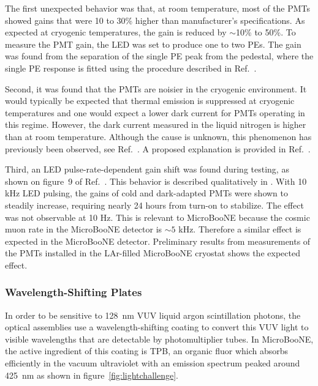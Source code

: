 The first unexpected behavior was that, at room temperature, 
most of the PMTs showed gains that were 10 to 30\% higher than manufacturer's specifications.
As expected at cryogenic temperatures, the gain is reduced by $\sim$10\% to 50\%.
To measure the PMT gain, the LED was set to produce one to two PEs.  
The gain was found from the separation of the single PE peak from the pedestal, where the single PE response is fitted using the procedure described in Ref.~\cite{Bellamy:1994bv}.   

Second, it was found that the PMTs are noisier in the cryogenic environment. 
It would typically be expected that thermal emission is suppressed at cryogenic temperatures and one would expect a lower dark current 
for PMTs operating in this regime.  
However, the dark current measured in the liquid nitrogen is higher than at room temperature. 
Although the cause is unknown, this phenomenon has previously been observed, see Ref.~\cite{Meyer:2008qb}. A proposed explanation is provided in Ref.~\cite{MeyerDark}.

Third, an LED pulse-rate-dependent gain shift was found during testing, as shown on figure~9 of Ref.~\cite{Briese:2013wua}.  This behavior is described qualitatively in \cite{HamamatsuBook}.  With 10 kHz LED pulsing, the gains of cold and dark-adapted PMTs were shown to steadily increase, requiring nearly 24 hours from turn-on to stabilize. The effect was not observable at 10 Hz.   This is relevant to MicroBooNE because the
cosmic muon rate in the MicroBooNE detector is $\sim 5$ kHz.  Therefore a similar effect is expected in the MicroBooNE detector.  Preliminary results from measurements of the PMTs installed in the LAr-filled MicroBooNE cryostat shows the expected effect. 



\subsubsection{Wavelength-Shifting Plates}
\label{sec:wavelengthshift}


In order to be sensitive to 128~nm VUV liquid argon scintillation photons, the optical assemblies use a wavelength-shifting coating to convert this VUV light to visible wavelengths that are detectable by photomultiplier tubes.  In MicroBooNE, the active ingredient of this coating is TPB, an organic fluor which absorbs efficiently in the vacuum ultraviolet with an emission spectrum peaked around 425~nm \cite{Burton:1973} as shown in figure~\ref{fig:lightchallenge}. 

